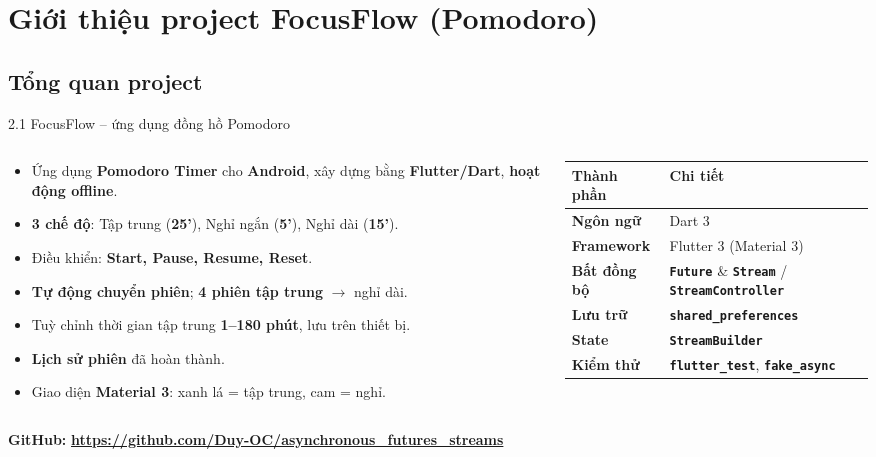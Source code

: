 \documentclass[aspectratio=169,10pt]{beamer}
\newcommand{\api}[1]{\texttt{\bfseries #1}}   %
\begin{document}
\section{Giới thiệu project FocusFlow (Pomodoro)}
\subsection{Tổng quan project}

\begin{frame}{2.1 FocusFlow -- ứng dụng đồng hồ Pomodoro}
  \begin{columns}[T]
    \begin{column}{0.52\textwidth}
      \small
      \begin{itemize}\itemsep3pt
        \item Ứng dụng \textbf{Pomodoro Timer} cho \textbf{Android}, xây dựng bằng \textbf{Flutter/Dart}, \textbf{hoạt động offline}.
        \item \textbf{3 chế độ}: Tập trung (\textbf{25'}), Nghỉ ngắn (\textbf{5'}), Nghỉ dài (\textbf{15'}).
        \item Điều khiển: \textbf{Start, Pause, Resume, Reset}.
        \item \textbf{Tự động chuyển phiên}; \textbf{4 phiên tập trung} $\rightarrow$ nghỉ dài.
        \item Tuỳ chỉnh thời gian tập trung \textbf{1--180 phút}, lưu trên thiết bị.
        \item \textbf{Lịch sử phiên} đã hoàn thành.
        \item Giao diện \textbf{Material 3}: xanh lá = tập trung, cam = nghỉ.
      \end{itemize}
    \end{column}
    \begin{column}{0.46\textwidth}
      \footnotesize
      \renewcommand{\arraystretch}{1.35}
      \begin{tabular}{@{}>{\raggedright\arraybackslash}p{2.2cm}>{\raggedright\arraybackslash}p{3.8cm}@{}}
        \hline
        \rowcolor{cHead}\textbf{Thành phần} & \textbf{Chi tiết}\\ \hline
        \textbf{Ngôn ngữ} & Dart 3\\ \hline
        \textbf{Framework} & Flutter 3 (Material 3)\\ \hline
        \textbf{Bất đồng bộ} & \api{Future} \& \api{Stream} / \api{StreamController}\\ \hline
        \textbf{Lưu trữ} & \api{shared\_preferences}\\ \hline
        \textbf{State} & \api{StreamBuilder}\\ \hline
        \textbf{Kiểm thử} & \api{flutter\_test}, \api{fake\_async}\\ \hline
      \end{tabular}
    \end{column}
  \end{columns}
  \vspace{8pt}
  \small \textbf{GitHub:} {\bfseries\url{https://github.com/Duy-OC/asynchronous_futures_streams}}
\end{frame}
\end{document}
